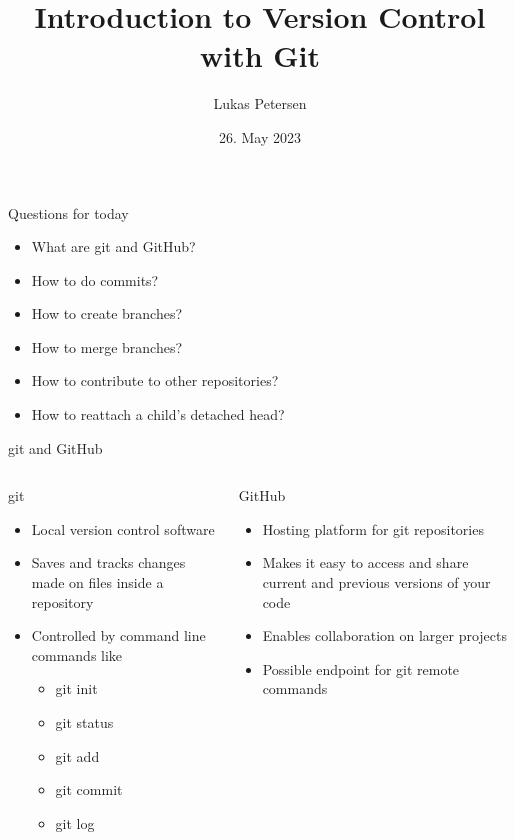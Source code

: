 \documentclass[en]{sdqbeamer}
\title[Git Introduction]{Introduction to Version Control with Git}
\subtitle{}
\author[Lukas Petersen]{Lukas Petersen}
\date[26.05.2023]{26. May 2023}
\begin{document}
 
\KITtitleframe

\begin{frame}{Questions for today}
\begin{itemize}
    \item What are git and GitHub?
    \item How to do commits?
    \item How to create branches?
    \item How to merge branches?
    \item How to contribute to other repositories?
    \item<2-> How to reattach a child's detached head?
\end{itemize}
\end{frame}



\begin{frame}{git and GitHub}

\begin{columns}[t]
\begin{column}{0.45\textwidth}
\begin{block}{git}
\begin{itemize}
    \item Local version control software
    \item Saves and tracks changes made on files inside a repository
    \item Controlled by command line commands like
    \begin{itemize}
        \item git init
        \item git status
        \item git add
        \item git commit
        \item git log
    \end{itemize}
\end{itemize}
\end{block}
\end{column}
\begin{column}{0.45\textwidth}
\begin{exampleblock}{GitHub}
\begin{itemize}
    \item Hosting platform for git repositories
    \item Makes it easy to access and share current and previous versions of your code
    \item Enables collaboration on larger projects
    \item Possible endpoint for git remote commands
\end{itemize}
\end{exampleblock}
\end{column}
\end{columns}
\end{frame}
\end{document}
